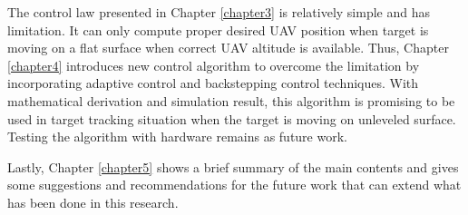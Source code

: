 The control law presented in Chapter \ref{chapter3} is relatively simple and has limitation. It can only compute proper desired UAV position when target is moving on a flat surface when correct UAV altitude is available. Thus, Chapter \ref{chapter4} introduces new control algorithm to overcome the limitation by incorporating adaptive control and backstepping control techniques. With mathematical derivation and simulation result, this algorithm is promising to be used in target tracking situation when the target is moving on unleveled surface. Testing the algorithm with hardware remains as future work. 

Lastly, Chapter \ref{chapter5} shows a brief summary of the main contents and gives some suggestions and recommendations for the future work that can extend what has been done in this research. 